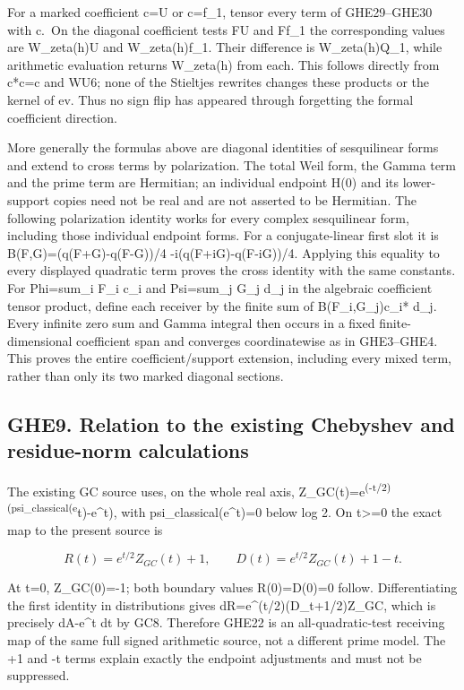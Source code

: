 For a marked coefficient c=U or c=f\_1, tensor every term of
GHE29--GHE30 with c.~On the diagonal coefficient tests FU and Ff\_1 the
corresponding values are W\_zeta(h)U and W\_zeta(h)f\_1. Their
difference is W\_zeta(h)Q\_1, while arithmetic evaluation returns
W\_zeta(h) from each. This follows directly from c*c=c and WU6; none of
the Stieltjes rewrites changes these products or the kernel of ev. Thus
no sign flip has appeared through forgetting the formal coefficient
direction.

More generally the formulas above are diagonal identities of
sesquilinear forms and extend to cross terms by polarization. The total
Weil form, the Gamma term and the prime term are Hermitian; an
individual endpoint H(0) and its lower-support copies need not be real
and are not asserted to be Hermitian. The following polarization
identity works for every complex sesquilinear form, including those
individual endpoint forms. For a conjugate-linear first slot it is
B(F,G)=(q(F+G)-q(F-G))/4 -i(q(F+iG)-q(F-iG))/4. Applying this equality
to every displayed quadratic term proves the cross identity with the
same constants. For Phi=sum\_i F\_i c\_i and Psi=sum\_j G\_j d\_j in the
algebraic coefficient tensor product, define each receiver by the finite
sum of B(F\_i,G\_j)c\_i* d\_j. Every infinite zero sum and Gamma
integral then occurs in a fixed finite-dimensional coefficient span and
converges coordinatewise as in GHE3--GHE4. This proves the entire
coefficient/support extension, including every mixed term, rather than
only its two marked diagonal sections.

\subsection{GHE9. Relation to the existing Chebyshev and residue-norm
calculations}\label{ghe9.-relation-to-the-existing-chebyshev-and-residue-norm-calculations}

The existing GC source uses, on the whole real axis,
Z\_GC(t)=e\textsuperscript{(-t/2)(psi\_classical(e}t)-e\^{}t), with
psi\_classical(e\^{}t)=0 below log 2. On t\textgreater=0 the exact map
to the present source is

\[
R(t)=e^{t/2}Z_{GC}(t)+1,\qquad
D(t)=e^{t/2}Z_{GC}(t)+1-t.
\tag{GHE31}
\]

At t=0, Z\_GC(0)=-1; both boundary values R(0)=D(0)=0 follow.
Differentiating the first identity in distributions gives
dR=e\^{}(t/2)(D\_t+1/2)Z\_GC, which is precisely dA-e\^{}t dt by GC8.
Therefore GHE22 is an all-quadratic-test receiving map of the same full
signed arithmetic source, not a different prime model. The +1 and -t
terms explain exactly the endpoint adjustments and must not be
suppressed.

